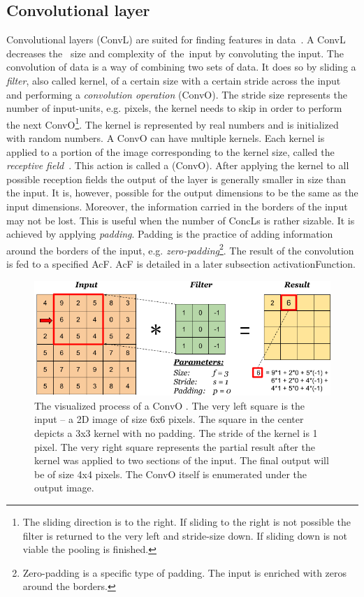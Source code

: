 \subsection{Convolutional layer}\label{convolutionalLayers}
Convolutional layers (ConvL) are suited for finding features in data~\cite{CNN}. A ConvL decreases the~ size and complexity of~the~input by convoluting the input. The convolution of data is a way of combining two sets of data.  It does so by sliding a \textit{filter}, also called kernel, of a certain size with a certain stride across the input and performing a \textit{convolution operation} (ConvO). The stride size represents the number of input-units, e.g. pixels, the kernel needs to skip in order to perform the next ConvO\footnote{The sliding direction is to the right. If sliding to the right is not possible the filter is returned to the very left and stride-size down. If sliding down is not viable the pooling is finished.}. The kernel is represented by real numbers and is initialized with random numbers. A ConvO can have multiple kernels. Each kernel is applied to a portion of the image corresponding to the kernel size, called the \textit{receptive field}~\cite{receptiveField}. This action is called a (ConvO). After applying the kernel to all possible reception fields the output of the layer is generally smaller in size than the input. It is, however, possible for the output dimensions to be the same as the input dimensions. Moreover, the information carried in the borders of the input may not be lost. This is useful when the number of ConcLs is rather sizable. It is achieved by applying \textit{padding}. Padding is the practice of adding information around the borders of the input, e.g. \textit{zero-padding}\footnote{Zero-padding is a specific type of padding. The input is enriched with zeros around the borders.}. The result of the convolution is fed to a specified AcF. AcF is detailed in a later subsection {activationFunction}.
\begin{figure}[ht!]
  \centering
  \includegraphics[width=\textwidth]{Images/convolution-operation.png}
  \caption{The visualized process of a ConvO \cite{convolutionOperationVisualization}. The very left square is the input -- a 2D image of size 6x6 pixels. The square in the center depicts a 3x3 kernel with no padding. The stride of the kernel is 1 pixel. The very right square represents the partial result after the kernel was applied to two sections of the input. The final output will be of size 4x4 pixels. The ConvO itself is enumerated under the output image.} 
  \label{convolutionalLayerVisualization}
\end{figure} 

